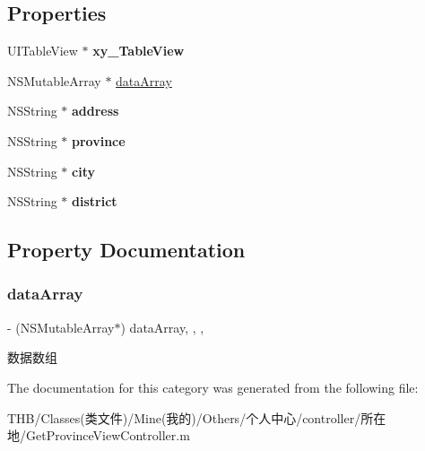 \subsection*{Properties}
\begin{DoxyCompactItemize}
\item 
\mbox{\label{category_get_province_view_controller_07_08_a08453b2fe7770d5dfe9eedd4d60b1513}} 
U\+I\+Table\+View $\ast$ {\bfseries xy\+\_\+\+Table\+View}
\item 
N\+S\+Mutable\+Array $\ast$ \mbox{\hyperlink{category_get_province_view_controller_07_08_a32c3e8fc451d96a7966fddcfa40e88c1}{data\+Array}}
\item 
\mbox{\label{category_get_province_view_controller_07_08_a81c7c63331511868859fd3d8ebed55b8}} 
N\+S\+String $\ast$ {\bfseries address}
\item 
\mbox{\label{category_get_province_view_controller_07_08_a5b7d2832d8d7985e3ea38632ef6da316}} 
N\+S\+String $\ast$ {\bfseries province}
\item 
\mbox{\label{category_get_province_view_controller_07_08_a63e8ec3d17b708445539fc33f7a3f3a5}} 
N\+S\+String $\ast$ {\bfseries city}
\item 
\mbox{\label{category_get_province_view_controller_07_08_af843da5c3880c901f910031e9107fd2e}} 
N\+S\+String $\ast$ {\bfseries district}
\end{DoxyCompactItemize}


\subsection{Property Documentation}
\mbox{\label{category_get_province_view_controller_07_08_a32c3e8fc451d96a7966fddcfa40e88c1}} 
\subsubsection{\texorpdfstring{data\+Array}{dataArray}}
{\footnotesize\ttfamily -\/ (N\+S\+Mutable\+Array$\ast$) data\+Array\hspace{0.3cm}{\ttfamily [read]}, {\ttfamily [write]}, {\ttfamily [nonatomic]}, {\ttfamily [strong]}}

数据数组 

The documentation for this category was generated from the following file\+:\begin{DoxyCompactItemize}
\item 
T\+H\+B/\+Classes(类文件)/\+Mine(我的)/\+Others/个人中心/controller/所在地/Get\+Province\+View\+Controller.\+m\end{DoxyCompactItemize}
